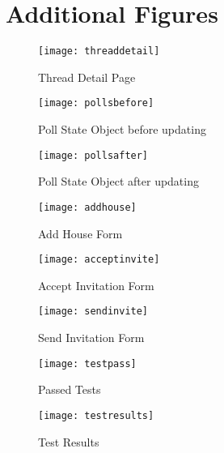 \chapter{Additional Figures}
\begin{figure}[H]
    \begin{center}
    \texttt{[image: threaddetail]}
    \end{center}
    \caption{Thread Detail Page}
    \label{fig:threaddetail}
\end{figure}

\begin{figure}[H]
    \begin{center}
    \texttt{[image: pollsbefore]}
    \end{center}
    \caption{Poll State Object before updating}
    \label{fig:pollsbefore}
\end{figure}

\begin{figure}[H]
    \begin{center}
    \texttt{[image: pollsafter]}
    \end{center}
    \caption{Poll State Object after updating}
    \label{fig:pollsafter}
\end{figure}

\begin{figure}[H]
    \begin{center}
    \texttt{[image: addhouse]}
    \end{center}
    \caption{Add House Form}
    \label{fig:addhouse}
\end{figure}

\begin{figure}[H]
    \begin{center}
    \texttt{[image: acceptinvite]}
    \end{center}
    \caption{Accept Invitation Form}
    \label{fig:acceptinvite}
\end{figure}

\begin{figure}[H]
    \begin{center}
    \texttt{[image: sendinvite]}
    \end{center}
    \caption{Send Invitation Form}
    \label{fig:sendinvite}
\end{figure}

\begin{figure}[H]
    \begin{center}
    \texttt{[image: testpass]}
    \end{center}
    \caption{Passed Tests}
    \label{fig:testpass}
\end{figure}

\begin{figure}[H]
    \begin{center}
    \texttt{[image: testresults]}
    \end{center}
    \caption{Test Results}
    \label{fig:testresults}
\end{figure}



